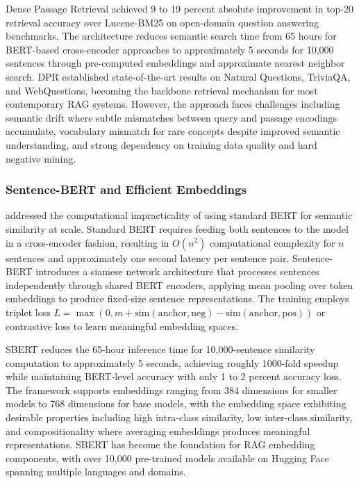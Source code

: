 \documentclass[11pt,letterpaper]{article}
\begin{document}
Dense Passage Retrieval achieved 9 to 19 percent absolute improvement in top-20 retrieval accuracy over Lucene-BM25 on open-domain question answering benchmarks. The architecture reduces semantic search time from 65 hours for BERT-based cross-encoder approaches to approximately 5 seconds for 10,000 sentences through pre-computed embeddings and approximate nearest neighbor search. DPR established state-of-the-art results on Natural Questions, TriviaQA, and WebQuestions, becoming the backbone retrieval mechanism for most contemporary RAG systems. However, the approach faces challenges including semantic drift where subtle mismatches between query and passage encodings accumulate, vocabulary mismatch for rare concepts despite improved semantic understanding, and strong dependency on training data quality and hard negative mining.

\subsubsection{Sentence-BERT and Efficient Embeddings}

\cite{reimers2019sentencebert} addressed the computational impracticality of using standard BERT for semantic similarity at scale. Standard BERT requires feeding both sentences to the model in a cross-encoder fashion, resulting in $O(n^2)$ computational complexity for $n$ sentences and approximately one second latency per sentence pair. Sentence-BERT introduces a siamese network architecture that processes sentences independently through shared BERT encoders, applying mean pooling over token embeddings to produce fixed-size sentence representations. The training employs triplet loss $L = \max(0, m + \text{sim}(\text{anchor}, \text{neg}) - \text{sim}(\text{anchor}, \text{pos}))$ or contrastive loss to learn meaningful embedding spaces.

SBERT reduces the 65-hour inference time for 10,000-sentence similarity computation to approximately 5 seconds, achieving roughly 1000-fold speedup while maintaining BERT-level accuracy with only 1 to 2 percent accuracy loss. The framework supports embeddings ranging from 384 dimensions for smaller models to 768 dimensions for base models, with the embedding space exhibiting desirable properties including high intra-class similarity, low inter-class similarity, and compositionality where averaging embeddings produces meaningful representations. SBERT has become the foundation for RAG embedding components, with over 10,000 pre-trained models available on Hugging Face spanning multiple languages and domains.
\end{document}
